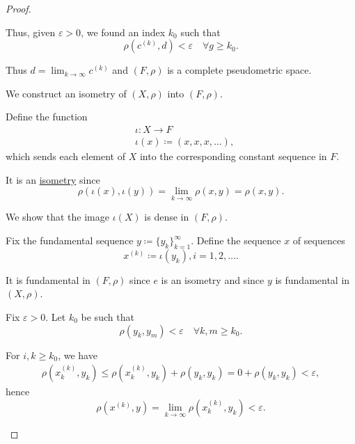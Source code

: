 \begin{proof}
\begin{defenum}
    Thus, given \( \varepsilon > 0 \), we found an index \( k_0 \) such that
    \begin{equation*}
      \rho(c^{(k)}, d) < \varepsilon \quad\forall g \geq k_0.
    \end{equation*}

    Thus \( d = \lim_{k \to \infty} c^{(k)} \) and \( (F, \rho) \) is a complete pseudometric space.

     We construct an isometry of \( (X, \rho) \) into \( (F, \rho) \).

    Define the function
    \begin{align*}
      &\iota: X \to F \\
      &\iota(x) \coloneqq (x, x, x, \ldots),
    \end{align*}
    which sends each element of \( X \) into the corresponding constant sequence in \( F \).

    It is an \hyperref[def:isometry]{isometry} since
    \begin{equation*}
      \rho(\iota(x),\iota(y)) = \lim_{k \to \infty} \rho(x, y) = \rho(x, y).
    \end{equation*}

     We show that the image \( \iota(X) \) is dense in \( (F, \rho) \).

    Fix the fundamental sequence \( y \coloneqq \{ y_k \}_{k=1}^\infty \). Define the sequence \( x \) of sequences
    \begin{equation*}
      x^{(k)} \coloneqq \iota(y_k), i = 1, 2, \ldots.
    \end{equation*}

    It is fundamental in \( (F, \rho) \) since \( e \) is an isometry and since \( y \) is fundamental in \( (X, \rho) \).

    Fix \( \varepsilon > 0 \). Let \( k_0 \) be such that
    \begin{equation*}
      \rho(y_k, y_m) < \varepsilon \quad\forall k, m \geq k_0.
    \end{equation*}

    For \( i, k \geq k_0 \), we have
    \begin{align*}
      \rho(x_k^{(k)}, y_k)
      \leq
      \rho(x_k^{(k)}, y_k) + \rho(y_k, y_k)
      =
      0 + \rho(y_k, y_k)
      <
      \varepsilon,
    \end{align*}
    hence
    \begin{equation*}
      \rho(x^{(k)}, y) = \lim_{k \to \infty} \rho(x_k^{(k)}, y_k) < \varepsilon.
    \end{equation*}


\end{defenum}
\end{proof}
